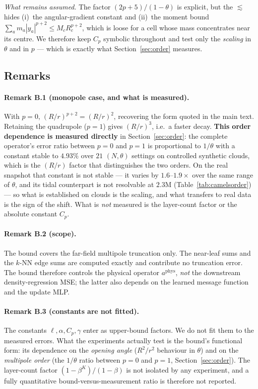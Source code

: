 \emph{What remains assumed.} The factor $(2p+5)/(1-\theta)$ is explicit, but the $\lesssim$
hides (i)~the angular-gradient constant and (ii)~the moment bound
$\sum_a m_a|y_a|^{p+2}\le M_cR_c^{p+2}$, which is loose for a cell whose mass concentrates near
its centre. We therefore keep $C_p$ symbolic throughout and test only the \emph{scaling} in
$\theta$ and in $p$ --- which is exactly what Section~\ref{sec:order} measures.

\subsection{Remarks}

\paragraph{Remark B.1 (monopole case, and what is measured).}
With $p=0$, $(R/r)^{p+2}=(R/r)^2$, recovering the form quoted in the main text. Retaining
the quadrupole ($p=1$) gives $(R/r)^3$, i.e.\ a faster decay. \textbf{This order dependence
is measured directly} in Section~\ref{sec:order}: the complete operator's error ratio between $p{=}0$ and
$p{=}1$ is proportional to $1/\theta$ with a constant stable to $4.93\%$ over $21$
$(N,\theta)$ settings on controlled synthetic clouds, which is the $(R/r)$ factor that distinguishes
the two orders. On the real snapshot that constant is not stable --- it varies by $1.6$--$1.9\times$
over the same range of $\theta$, and its tidal counterpart is not resolvable at $2.3$M
(Table~\ref{tab:camelsorder}) --- so what is established on clouds is the scaling, and what transfers
to real data is the sign of the shift. What is \emph{not} measured is the layer-count factor or the
absolute constant $C_p$.

\paragraph{Remark B.2 (scope).}
The bound covers the far-field multipole truncation only. The near-leaf sums and the $k$-NN
edge sums are computed exactly and contribute no truncation error. The bound therefore
controls the physical operator $a^{\mathrm{phys}}$, \emph{not} the downstream
density-regression MSE; the latter also depends on the learned message function and the
update MLP.

\paragraph{Remark B.3 (constants are not fitted).}
The constants $\ell,\alpha,C_p,\gamma$ enter as upper-bound factors. We do not fit them to
the measured errors. What the experiments actually test is the bound's functional form: its
dependence on the \emph{opening angle} ($R^2/r^2$ behaviour in $\theta$) and on the
\emph{multipole order} (the $1/\theta$ ratio between $p{=}0$ and $p{=}1$, Section~\ref{sec:order}). The
layer-count factor $(1-\beta^K)/(1-\beta)$ is not isolated by any experiment, and a fully
quantitative bound-versus-measurement ratio is therefore not reported.

